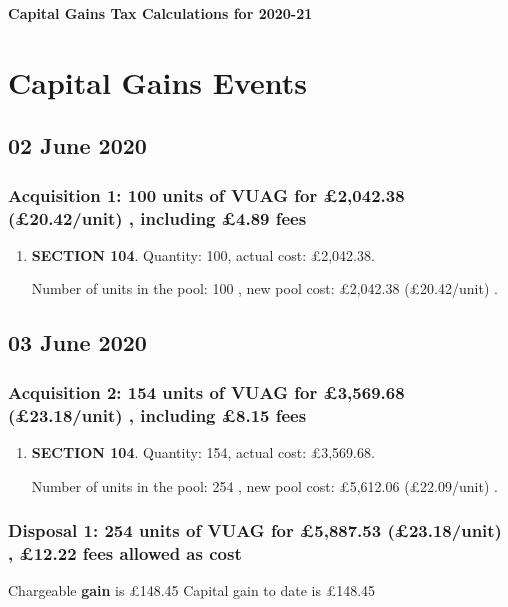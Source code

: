 \documentclass{article}
\begin{document}
\centerline{\Large\bfseries Capital Gains Tax Calculations for 2020-21}

\section*{Capital Gains Events}


\subsection*{02 June 2020}
\subsubsection*{
    Acquisition 1: 100 units of VUAG for £2,042.38
    (£20.42/unit)%
    , including £4.89 fees
}

\begin{enumerate}
\item \textbf{SECTION 104}. Quantity: 100,
    actual cost: £2,042.38.

    Number of units in the pool:
    100%
,
    new pool cost: £2,042.38
    (£20.42/unit)%
.

\end{enumerate}



\subsection*{03 June 2020}
\subsubsection*{
    Acquisition 2: 154 units of VUAG for £3,569.68
    (£23.18/unit)%
    , including £8.15 fees
}

\begin{enumerate}
\item \textbf{SECTION 104}. Quantity: 154,
    actual cost: £3,569.68.

    Number of units in the pool:
    254%
,
    new pool cost: £5,612.06
    (£22.09/unit)%
.

\end{enumerate}

\subsubsection*{
    Disposal 1: 254 units of VUAG
for £5,887.53
    (£23.18/unit)%
    , £12.22 fees allowed as cost
}
Chargeable \textbf{gain} is £148.45
Capital gain to date is £148.45
\end{document}
